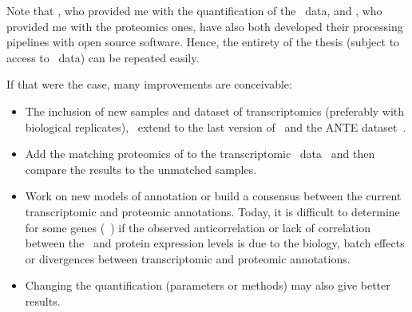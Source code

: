 Note that \nuno, who provided me with the quantification of the \gtex\ data,
and \james, who provided me with the proteomics ones,
have also both developed their processing pipelines with open source software.
Hence, the entirety of the thesis (subject to access to \gtex\ data)
can be repeated easily.\mybr\

If that were the case, many improvements are conceivable:
\vspace{-3mm}
\begin{itemize}[topsep=0pt,nosep]
        \item The inclusion of new samples and dataset of transcriptomics
            (preferably with biological replicates),
            \eg\ extend to the last version of \gtex\ and
            the ANTE dataset~.
        \item Add the matching proteomics of \citet{Wang2019-ut}
            to the transcriptomic \uhlen\ data~
            and then compare the results to the unmatched samples.
        \item Work on new models of annotation or
            build a consensus between the current transcriptomic and proteomic
            annotations.
            Today, it is difficult to determine for some genes
            (\eg\ )
            if the observed anticorrelation or lack of correlation
            between the \mRNA\ and protein expression levels is due to the biology,
            batch effects or divergences between transcriptomic and
            proteomic annotations.
        \item Changing the quantification (parameters or methods)
            may also give better results.
\end{itemize}

